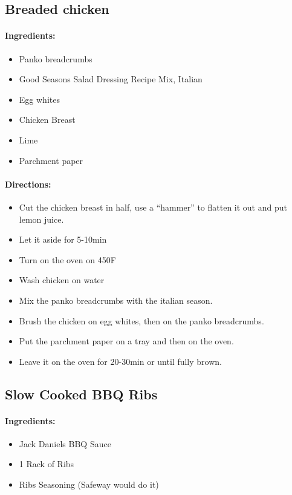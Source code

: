 \documentclass{article}
\begin{document}
\subsection{Breaded chicken}

\paragraph{Ingredients:}

\begin{itemize}
	\item Panko breadcrumbs
	\item Good Seasons Salad Dressing Recipe Mix, Italian
	\item Egg whites
	\item Chicken Breast
	\item Lime
	\item Parchment paper
\end{itemize}

\paragraph{Directions:}
\begin{itemize}
	\item Cut the chicken breast in half, use a “hammer” to flatten it out and put lemon juice.
	\item Let it aside for 5-10min
	\item Turn on the oven on 450F
	\item Wash chicken on water
	\item Mix the panko breadcrumbs with the italian season.
	\item Brush the chicken on egg whites, then on the panko breadcrumbs.
	\item Put the parchment paper on a tray and then on the oven.
	\item Leave it on the oven for 20-30min or until fully brown.
\end{itemize}

\subsection{Slow Cooked BBQ Ribs}

\paragraph{Ingredients:}

\begin{itemize}
\item Jack Daniels BBQ Sauce 
\item 1 Rack of Ribs 
\item Ribs Seasoning (Safeway would do it)
\end{itemize}
\end{document}
